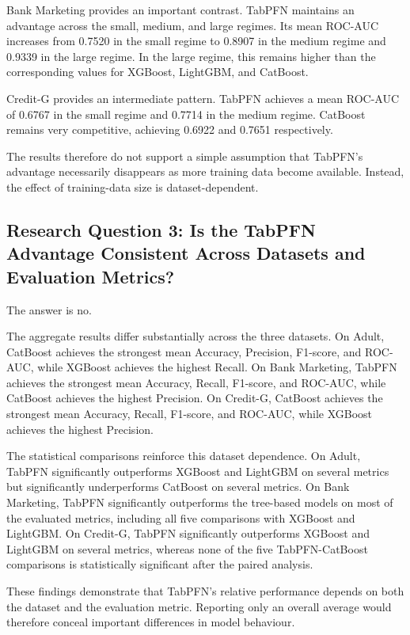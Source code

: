 Bank Marketing provides an important contrast. TabPFN maintains an advantage across the small, medium, and large regimes. Its mean ROC-AUC increases from 0.7520 in the small regime to 0.8907 in the medium regime and 0.9339 in the large regime. In the large regime, this remains higher than the corresponding values for XGBoost, LightGBM, and CatBoost.

Credit-G provides an intermediate pattern. TabPFN achieves a mean ROC-AUC of 0.6767 in the small regime and 0.7714 in the medium regime. CatBoost remains very competitive, achieving 0.6922 and 0.7651 respectively.

The results therefore do not support a simple assumption that TabPFN's advantage necessarily disappears as more training data become available. Instead, the effect of training-data size is dataset-dependent.

\subsection{Research Question 3: Is the TabPFN Advantage Consistent Across Datasets and Evaluation Metrics?}\label{research-question-3-is-the-tabpfn-advantage-consistent-across-datasets-and-evaluation-metrics}

The answer is no.

The aggregate results differ substantially across the three datasets. On Adult, CatBoost achieves the strongest mean Accuracy, Precision, F1-score, and ROC-AUC, while XGBoost achieves the highest Recall. On Bank Marketing, TabPFN achieves the strongest mean Accuracy, Recall, F1-score, and ROC-AUC, while CatBoost achieves the highest Precision. On Credit-G, CatBoost achieves the strongest mean Accuracy, Recall, F1-score, and ROC-AUC, while XGBoost achieves the highest Precision.

The statistical comparisons reinforce this dataset dependence. On Adult, TabPFN significantly outperforms XGBoost and LightGBM on several metrics but significantly underperforms CatBoost on several metrics. On Bank Marketing, TabPFN significantly outperforms the tree-based models on most of the evaluated metrics, including all five comparisons with XGBoost and LightGBM. On Credit-G, TabPFN significantly outperforms XGBoost and LightGBM on several metrics, whereas none of the five TabPFN-CatBoost comparisons is statistically significant after the paired analysis.

These findings demonstrate that TabPFN's relative performance depends on both the dataset and the evaluation metric. Reporting only an overall average would therefore conceal important differences in model behaviour.

